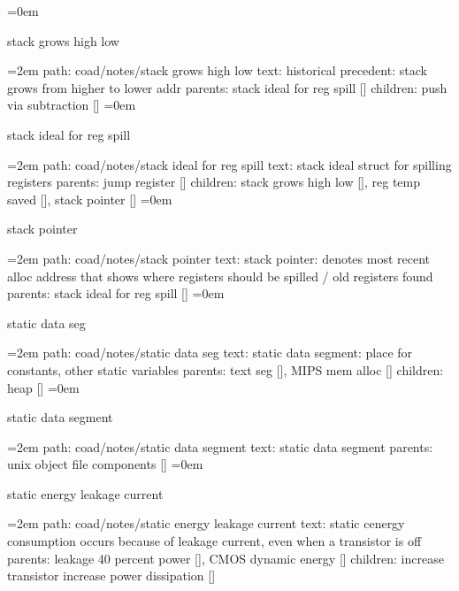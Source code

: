 \leftskip=0em
\par\endgroup
\bigskip
{}
stack grows high low
\smallskip
\par\begingroup
\leftskip=2em
path: coad/notes/stack grows high low
\smallskip
text:  historical precedent: stack grows from higher to lower addr
\smallskip
parents:  stack ideal for reg spill []
\smallskip
children: push via subtraction []
\smallskip
\leftskip=0em
\par\endgroup
\bigskip
{}
stack ideal for reg spill
\smallskip
\par\begingroup
\leftskip=2em
path: coad/notes/stack ideal for reg spill
\smallskip
text:  stack ideal struct for spilling registers
\smallskip
parents:  jump register []
\smallskip
children: stack grows high low [], reg temp saved [], stack pointer []
\smallskip
\leftskip=0em
\par\endgroup
\bigskip
{}
stack pointer
\smallskip
\par\begingroup
\leftskip=2em
path: coad/notes/stack pointer
\smallskip
text:  stack pointer: denotes most recent alloc address that shows where registers should be spilled / old registers found
\smallskip
parents:  stack ideal for reg spill []
\smallskip
\leftskip=0em
\par\endgroup
\bigskip
{}
static data seg
\smallskip
\par\begingroup
\leftskip=2em
path: coad/notes/static data seg
\smallskip
text:  static data segment: place for constants, other static variables
\smallskip
parents:  text seg [], MIPS mem alloc []
\smallskip
children: heap []
\smallskip
\leftskip=0em
\par\endgroup
\bigskip
{}
static data segment
\smallskip
\par\begingroup
\leftskip=2em
path: coad/notes/static data segment
\smallskip
text:  static data segment
\smallskip
parents:  unix object file components []
\smallskip
\leftskip=0em
\par\endgroup
\bigskip
{}
static energy leakage current
\smallskip
\par\begingroup
\leftskip=2em
path: coad/notes/static energy leakage current
\smallskip
text:  static cenergy consumption occurs because of leakage current, even when a transistor is off
\smallskip
parents:  leakage 40 percent power [], CMOS dynamic energy []
\smallskip
children: increase transistor increase power dissipation []
